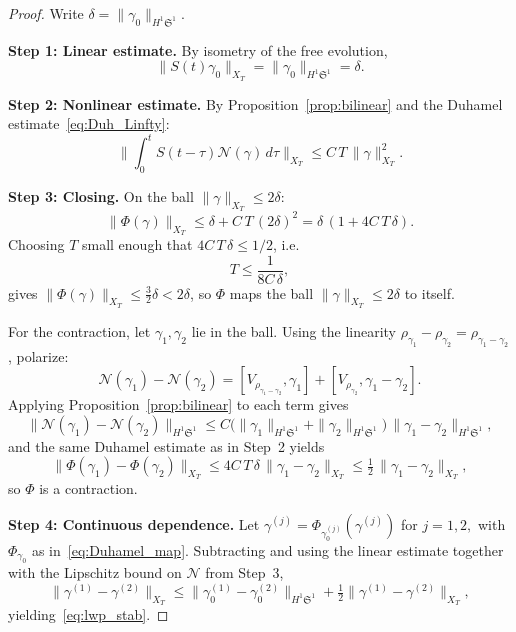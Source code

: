 \documentclass[10pt,a4paper]{amsart}
\newcommand{\Sp}{\mathfrak{S}}
\begin{document}
\begin{proof}
Write $\delta=\|\gamma_0\|_{H^1\Sp^1}$.

\medskip

\noindent\textbf{Step 1: Linear estimate.} By isometry of the free evolution,
\begin{equation}\label{eq:linear_XT}
  \|S(t)\gamma_0\|_{X_T}
  = \|\gamma_0\|_{H^1\Sp^1}
  = \delta.
\end{equation}

\medskip

\noindent\textbf{Step 2: Nonlinear estimate.} By Proposition~\ref{prop:bilinear} and the Duhamel estimate~\eqref{eq:Duh_Linfty}:
\begin{equation}\label{eq:Duh_S1}
  \biggl\|\int_0^t S(t-\tau)
  \mathcal{N}(\gamma)\,d\tau
  \biggr\|_{X_T}
  \le C\,T\,\|\gamma\|_{X_T}^2.
\end{equation}

\noindent\textbf{Step 3: Closing.} On the ball $\|\gamma\|_{X_T}\le 2\delta$:
\[
  \|\Phi(\gamma)\|_{X_T}
  \le \delta + C\,T\,(2\delta)^2
  = \delta\,(1 + 4C\,T\,\delta).
\]
Choosing $T$ small enough that $4C\,T\,\delta\le 1/2$, i.e.\
\begin{equation}\label{eq:delta_T}
  T \le \frac{1}{8C\,\delta},
\end{equation}
gives $\|\Phi(\gamma)\|_{X_T}\le\tfrac{3}{2}\delta<2\delta$, so $\Phi$ maps the ball $\|\gamma\|_{X_T}\le 2\delta$ to itself.

For the contraction, let $\gamma_1,\gamma_2$ lie in the ball. Using the linearity $\rho_{\gamma_1}-\rho_{\gamma_2}=\rho_{\gamma_1-\gamma_2}$, polarize:
\[
  \mathcal{N}(\gamma_1)-\mathcal{N}(\gamma_2)
  = [V_{\rho_{\gamma_1-\gamma_2}},\gamma_1]
  + [V_{\rho_{\gamma_2}},\gamma_1-\gamma_2].
\]
Applying Proposition~\ref{prop:bilinear} to each term gives
\[
  \|\mathcal{N}(\gamma_1)-\mathcal{N}(\gamma_2)\|_{H^1\Sp^1}
  \le C\bigl(\|\gamma_1\|_{H^1\Sp^1}+\|\gamma_2\|_{H^1\Sp^1}\bigr)
  \,\|\gamma_1-\gamma_2\|_{H^1\Sp^1},
\]
and the same Duhamel estimate as in Step~2 yields
\[
  \|\Phi(\gamma_1)-\Phi(\gamma_2)\|_{X_T}
  \le 4C\,T\,\delta\,
  \|\gamma_1-\gamma_2\|_{X_T}
  \le \tfrac{1}{2}\,
  \|\gamma_1-\gamma_2\|_{X_T},
\]
so $\Phi$ is a contraction.

\medskip

\noindent\textbf{Step 4: Continuous dependence.} Let $\gamma^{(j)}=\Phi_{\gamma_0^{(j)}}(\gamma^{(j)})$ for $j=1,2,$ with $\Phi_{\gamma_0}$ as in~\eqref{eq:Duhamel_map}. Subtracting and using the linear estimate together with the Lipschitz bound on $\mathcal{N}$ from Step~3,
\[
  \|\gamma^{(1)}-\gamma^{(2)}\|_{X_T}
  \le \|\gamma_0^{(1)}-\gamma_0^{(2)}\|_{H^1\Sp^1}
  + \tfrac12
    \|\gamma^{(1)}-\gamma^{(2)}\|_{X_T},
\]
yielding~\eqref{eq:lwp_stab}.
\end{proof}
\end{document}
